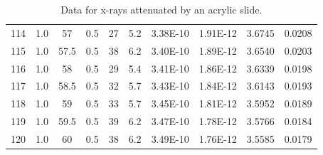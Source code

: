 \documentclass[justified]{tufte-book}
\begin{document}
\begin{table}[ht]
\begin{tabular}{cccccccccc}
114       & 1.0 & 57       & 0.5         & 27    & 5.2      & 3.38E-10      & 1.91E-12         & 3.6745       & 0.0208 \\
115       & 1.0 & 57.5     & 0.5         & 38    & 6.2      & 3.40E-10      & 1.89E-12         & 3.6540       & 0.0203 \\
116       & 1.0 & 58       & 0.5         & 29    & 5.4      & 3.41E-10      & 1.86E-12         & 3.6339       & 0.0198 \\
117       & 1.0 & 58.5     & 0.5         & 32    & 5.7      & 3.43E-10      & 1.84E-12         & 3.6143       & 0.0193 \\
118       & 1.0 & 59       & 0.5         & 33    & 5.7      & 3.45E-10      & 1.81E-12         & 3.5952       & 0.0189 \\
119       & 1.0 & 59.5     & 0.5         & 39    & 6.2      & 3.47E-10      & 1.78E-12         & 3.5766       & 0.0184 \\
120       & 1.0 & 60       & 0.5         & 38    & 6.2      & 3.49E-10      & 1.76E-12         & 3.5585       & 0.0179         
\end{tabular}
\caption{Data for x-rays attenuated by an acrylic slide.}
\label{tab:xrcg6}
\end{table}









\end{document}

